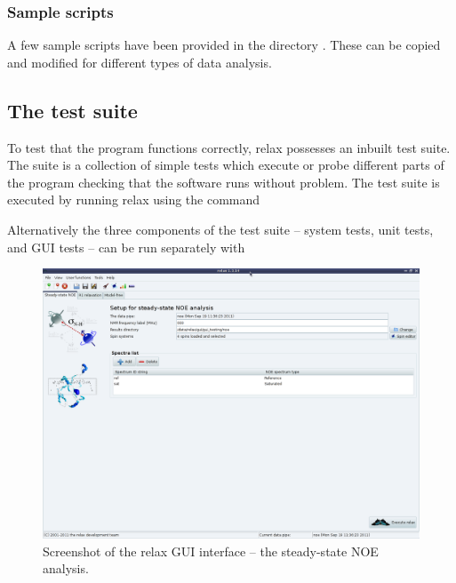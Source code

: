 \subsubsection{Sample scripts}

A few sample scripts have been provided in the directory .  These can be copied and modified for different types of data analysis.




\subsection{The test suite}

To test that the program functions correctly, relax possesses an inbuilt test suite.  The suite is a collection of simple tests which execute or probe different parts of the program checking that the software runs without problem.  The test suite is executed by running relax using the command


Alternatively the three components of the test suite -- system tests, unit tests, and GUI tests -- can be run separately with





\begin{figure}
\centerline{\includegraphics[width=\textwidth, bb=14 14 1065 768]{graphics/screenshots/analysis_noe}}
\caption[GUI screenshot -- NOE analysis]{Screenshot of the relax GUI interface -- the steady-state NOE analysis.}\label{fig: screenshot: NOE analysis}
\end{figure}



